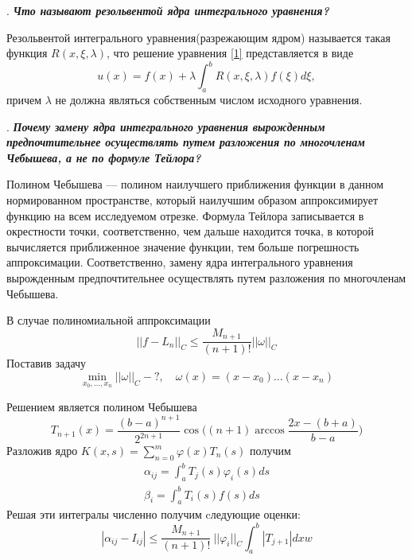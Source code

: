 \documentclass[12pt, a4paper]{article}
\newcounter{mycounter}
\newcommand{\question}[1]{%
	\stepcounter{mycounter}%
	\textbf{\themycounter}.  %
	\textbf{\textit{#1}}
	
}
\begin{document}
	
	\bigskip
	\question{Что называют резольвентой ядра интегрального уравнения?}
	
	Резольвентой интегрального уравнения(разрежающим ядром) называется такая функция $R(x, \xi, \lambda)$, что решение уравнения \eqref{1} представляется в виде
	\begin{equation}
		u(x) = f(x) + \lambda \int_a^b R(x, \xi, \lambda) f(\xi) d\xi,
	\end{equation}
	причем $\lambda$ не должна являться собственным числом исходного уравнения.
	
	
	\bigskip
	\question{Почему замену ядра интегрального уравнения вырожденным предпочтительнее осуществлять путем разложения по многочленам Чебышева, а не по формуле Тейлора?}
	
	Полином Чебышева — полином наилучшего приближения функции в данном
	нормированном пространстве, который наилучшим образом аппроксимирует
	функцию на всем исследуемом отрезке. Формула Тейлора записывается в окрестности точки, соответственно, чем дальше находится точка, в которой вычисляется приближенное значение функции, тем больше погрешность аппроксимации. Соответственно, замену ядра интегрального уравнения вырожденным предпочтительнее осуществлять путем разложения по многочленам Чебышева.
	
	В случае полиномиальной аппроксимации 
	\begin{equation}
		||f - L_n||_C \leqslant \dfrac{M_{n + 1}}{(n + 1)!} ||\omega||_C 
	\end{equation}
	Поставив задачу 
	\begin{equation}
		\min_{x_0,\dots,x_n}||\omega||_C - ?,\quad \omega(x) = (x - x_0)\dots(x - x_n)
	\end{equation}
	
	Решением является полином Чебышева
	\begin{equation}
		T_{n + 1}(x) = \dfrac{(b - a)^{n + 1}}{2^{2n + 1}} \cos\Big((n + 1) 
		\arccos{\dfrac{2 x - (b + a)}{b - a}} \Big)
	\end{equation}
	Разложив ядро $K(x, s) = \sum_{n = 0}^{m}\varphi(x)T_{n}(s)$
	получим
	\begin{gather}
		\alpha_{ij} = \int_{a}^{b} T_{j}(s) \varphi_i(s) ds \\
		\beta_i =  \int_{a}^{b} T_{i}(s) f(s) ds
	\end{gather}
	Решая эти интегралы численно получим cледующие оценки:
	\begin{equation}
		|\alpha_{ij} - I_{ij}| \le \dfrac{M_{n+1}}{(n+1)!}\ ||\varphi_i||_C \int_{a}^{b}|T_{j + 1}|dxw	
	\end{equation}
	
\end{document}
